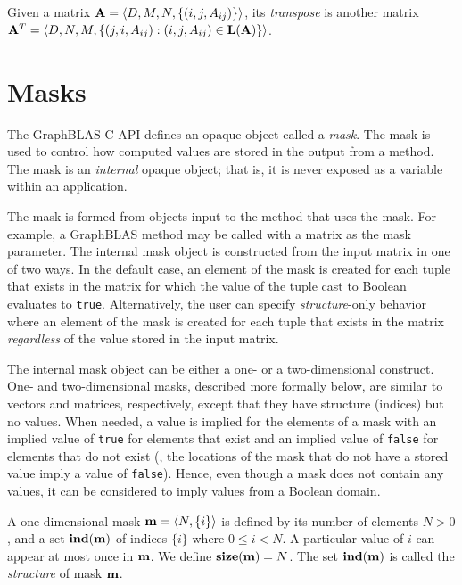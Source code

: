 Given a matrix ${\bf A} = \langle D, M, N, \{ (i,j,A_{ij}) \} \rangle$,
its \emph{transpose} is another matrix ${\bf A}^T = \langle D, N, M, \{
(j,i,A_{ij}) : (i,j,A_{ij}) \in \mathbf{L}({\bf A}) \} \rangle$.

\section{Masks}
\label{Sec:Masks}

The GraphBLAS C API defines an opaque object called a \emph{mask}.  The mask
is used to control how computed values are stored in the output from a method. 
The mask is an \emph{internal} opaque object; that is, it is never exposed as a variable
within an application. 

The mask is formed from objects input to the method that uses 
the mask.  For example, a GraphBLAS method may be called with a matrix as the mask
parameter.   The internal mask object is constructed from the input matrix in one
of two ways.  In the default case, an element of the mask is created for each 
tuple that exists in the matrix for which the value of the tuple cast to Boolean 
evaluates to {\tt true}.  Alternatively, the user can specify {\em structure}-only behavior where
an element of the mask is created for each tuple that exists in the matrix 
{\em regardless} of the value stored in the input matrix.

The internal mask object can be either a one- or a two-dimensional construct.  One- and
two-dimensional masks, described more formally below, are similar to
vectors and matrices, respectively, except that they have structure
(indices) but no values.  When needed, a value is implied for the elements of a 
mask with an implied value of {\tt true} for elements that exist 
and an implied value of {\tt false} for elements that do not exist (\ie,
the locations of the mask that do not have a stored value imply a value of {\tt false}).
Hence, even though a mask does not contain any values, it can be 
considered to imply values from a Boolean domain.

A one-dimensional mask ${\bf m} = \langle N, \{ i \} \rangle$ is
defined by its number of elements $N>0$, and a set $\mathbf{ind}({\bf m})$
of indices $\{ i \}$ where $0 \leq i < N$.  A particular value of $i$ can
appear at most once in ${\bf m}$. We define $\mathbf{size}({\bf m})
= N$. The set $\mathbf{ind}({\bf m})$ is called the \emph{structure} of mask ${\bf m}$.

